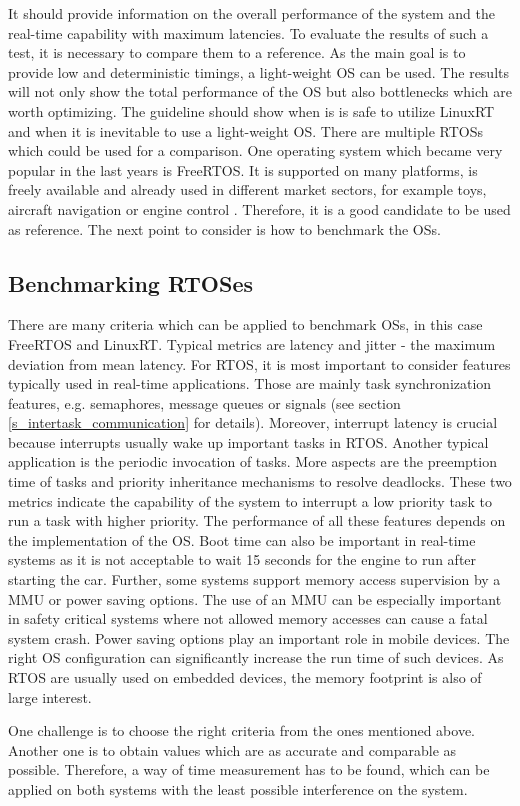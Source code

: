 It should provide information on the overall performance of the system and the real-time capability with maximum latencies.  
To evaluate the results of such a test, it is necessary to compare them to a reference. 
As the main goal is to provide low and deterministic timings, a light-weight \ac{OS} can be used.
The results will not only show the total performance of the \ac{OS} but also bottlenecks which are worth optimizing. 
The guideline should show when is is safe to utilize LinuxRT and when it is inevitable to use a light-weight \ac{OS}.
There are multiple \acp{RTOS} which could be used for a comparison. 
One operating system which became very popular in the last years is FreeRTOS.
It is supported on many platforms, is freely available and already used in different market sectors, for example toys, aircraft navigation or engine control \cite{freertos}. 
Therefore, it is a good candidate to be used as reference.  
The next point to consider is how to benchmark the \acp{OS}.
 
\subsection{Benchmarking RTOSes}
There are many criteria which can be applied to benchmark \acp{OS}, in this case FreeRTOS and LinuxRT.
Typical metrics are latency and jitter - the maximum deviation from mean latency.
For \ac{RTOS}, it is most important to consider features typically used in real-time applications.
Those are mainly task synchronization features, e.g. semaphores, message queues or signals (see section \ref{s_intertask_communication} for details).
Moreover, interrupt latency is crucial because interrupts usually wake up important tasks in \ac{RTOS}.
Another typical application is the periodic invocation of tasks. 
More aspects are the preemption time of tasks and priority inheritance mechanisms to resolve deadlocks.
These two metrics indicate the capability of the system to interrupt a low priority task to run a task with higher priority. 
The performance of all these features depends on the implementation of the \ac{OS}.
Boot time can also be important in real-time systems as it is not acceptable to wait 15 seconds for the engine to run after starting the car.
Further, some systems support memory access supervision by a \ac{MMU} or power saving options.
The use of an \ac{MMU} can be especially important in safety critical systems where not allowed memory accesses can cause a fatal system crash.
Power saving options play an important role in mobile devices.
The right \ac{OS} configuration can significantly increase the run time of such devices.
As \ac{RTOS} are usually used on embedded devices, the memory footprint is also of large interest. 
\par
One challenge is to choose the right criteria from the ones mentioned above. 
Another one is to obtain values which are as accurate and comparable as possible.
Therefore, a way of time measurement has to be found, which can be applied on both systems with the least possible interference on the system.

